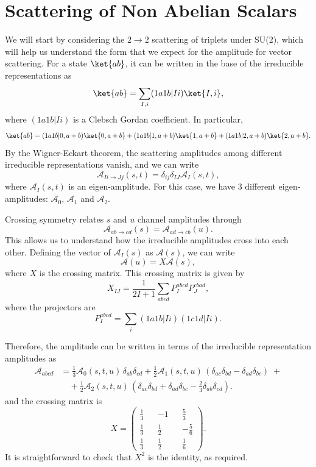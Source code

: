 \section{Scattering of Non Abelian Scalars}
We will start by considering the $2 \rightarrow 2$ scattering of triplets under SU(2), which will help us understand the form that we expect for the amplitude for vector scattering.
For a state $\ket{ab}$, it can be written in the base of the irreducible representations as 
$$
\ket{ab} = \sum_{I, i} (1a1b|Ii) \ket{I, i},
$$
where $(1a1b|Ii)$ is a Clebsch Gordan coefficient. In particular, 
$$
\ket{ab} = (1a1b|0,a+b) \ket{0, a+b}+(1a1b|1,a+b) \ket{1, a+b} + (1a1b|2,a+b) \ket{2, a+b}.
$$
By the Wigner-Eckart theorem, the scattering amplitudes among different irreducible representations vanish, and we can write 
$$
\mathcal{A}_{Ii \rightarrow J j} (s, t) = \delta_{ij} \delta_{IJ} \mathcal{A}_I(s, t),
$$
where $\mathcal{A}_I(s, t)$ is an eigen-amplitude. For this case, we have 3 different eigen-amplitudes: $\mathcal{A}_0$, $\mathcal{A}_1$ and $\mathcal{A}_2$.

Crossing symmetry relates $s$ and $u$ channel amplitudes through
$$
\mathcal{A}_{ab \rightarrow cd} (s) = \mathcal{A}_{ad \rightarrow cb} (u).
$$
This allows us to understand how the irreducible amplitudes cross into each other. Defining the vector of $\mathcal{A}_I(s)$ as $\mathcal{A}(s)$, we can write 
$$
\mathcal{A}(u) = X \mathcal{A}(s),
$$
where $X$ is the crossing matrix. This crossing matrix is given by 
$$
X_{IJ} = \frac{1}{2I+1} \sum_{abcd}P_I^{abcd}P^{cbad}_J, 
$$
where the projectors are 
$$
P^{abcd}_I=\sum_i (1a1b|Ii)(1c1d|Ii).
$$

Therefore, the amplitude can be written in terms of the irreducible representation amplitudes as 
\begin{align*}
    \mathcal{A}_{abcd} &= \frac{1}{3} \mathcal{A}_0(s,t,u)\, \delta_{ab}\delta_{cd}
    + \frac{1}{2} \mathcal{A}_1(s,t,u)\, (\delta_{ac}\delta_{bd}-\delta_{ad}\delta_{bc}) \;  + \\
    &\quad + \frac{1}{2} \mathcal{A}_2(s,t,u)\,
    \left( \delta_{ac} \delta_{bd} + \delta_{ad} \delta_{bc}
    - \frac{2}{3} \delta_{ab}\delta_{cd} \right).
    \end{align*}
and the crossing matrix is 
$$
X=\begin{pmatrix}
    \frac{1}{3} && -1 && \frac{5}{3} \\
    \frac{1}{3} && \frac{1}{2} && - \frac{5}{6} \\
    \frac{1}{3} &&  \frac{1}{2} && \frac{1}{6}
\end{pmatrix}.
$$
It is straightforward to check that $X^2$ is the identity, as required.

